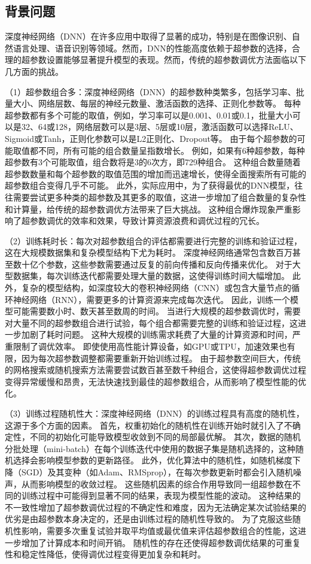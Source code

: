 \subsection{背景问题}

深度神经网络（DNN）在许多应用中取得了显著的成功，特别是在图像识别、自然语言处理、语音识别等领域。然而，DNN的性能高度依赖于超参数的选择，合理的超参数设置能够显著提升模型的表现。然而，传统的超参数调优方法面临以下几方面的挑战。

（1）超参数组合多：深度神经网络（DNN）的超参数种类繁多，包括学习率、批量大小、网络层数、每层的神经元数量、激活函数的选择、正则化参数等。
每种超参数都有多个可能的取值，例如，学习率可以是0.001、0.01或0.1，批量大小可以是32、64或128，网络层数可以是3层、5层或10层，激活函数可以选择ReLU、Sigmoid或Tanh，正则化参数可以是L2正则化、Dropout等。
由于每个超参数的可能取值都不同，所有可能的组合数量呈指数增长。
例如，如果有6种超参数，每种超参数有3个可能取值，组合数将是3的6次方，即729种组合。
这种组合数量随着超参数数量和每个超参数的取值范围的增加而迅速增长，使得全面搜索所有可能的超参数组合变得几乎不可能。
此外，实际应用中，为了获得最优的DNN模型，往往需要尝试更多种类的超参数及其更多的取值，这进一步增加了组合数量的复杂性和计算量，给传统的超参数调优方法带来了巨大挑战。
这种组合爆炸现象严重影响了超参数调优的效率和效果，导致计算资源浪费和调优过程的冗长。

（2）训练耗时长：每次对超参数组合的评估都需要进行完整的训练和验证过程，这在大规模数据集和复杂模型结构下尤为耗时。
深度神经网络通常包含数百万甚至数十亿个参数，这些参数需要通过反复的前向传播和反向传播来优化。
对于大型数据集，每次训练迭代都需要处理大量的数据，这使得训练时间大幅增加。
此外，复杂的模型结构，如深度较大的卷积神经网络（CNN）或包含大量节点的循环神经网络（RNN），需要更多的计算资源来完成每次迭代。
因此，训练一个模型可能需要数小时、数天甚至数周的时间。
当进行大规模的超参数调优时，需要对大量不同的超参数组合进行试验，每个组合都需要完整的训练和验证过程，这进一步加剧了耗时问题。
这种大规模的训练需求耗费了大量的计算资源和时间，严重限制了调优效率。
即使使用高性能计算设备，如GPU或TPU，加速效果也有限，因为每次超参数调整都需要重新开始训练过程。
由于超参数空间巨大，传统的网格搜索或随机搜索方法需要尝试数百甚至数千种组合，这使得超参数调优过程变得异常缓慢和昂贵，无法快速找到最佳的超参数组合，从而影响了模型性能的优化。

（3）训练过程随机性大：深度神经网络（DNN）的训练过程具有高度的随机性，这源于多个方面的因素。
首先，权重初始化的随机性在训练开始时就引入了不确定性，不同的初始化可能导致模型收敛到不同的局部最优解。
其次，数据的随机分批处理（mini-batch）在每个训练迭代中使用的数据子集是随机选择的，这种随机选择会影响模型参数的更新路径。
此外，优化算法中的随机性，如随机梯度下降（SGD）及其变种（如Adam、RMSprop），在每次参数更新时都会引入随机噪声，从而影响模型的收敛过程。
这些随机因素的综合作用导致同一组超参数在不同的训练过程中可能得到显著不同的结果，表现为模型性能的波动。
这种结果的不一致性增加了超参数调优过程的不确定性和难度，因为无法确定某次试验结果的优劣是由超参数本身决定的，还是由训练过程的随机性导致的。
为了克服这些随机性影响，需要多次重复试验并取平均值或最优值来评估超参数组合的性能，这进一步增加了计算成本和时间开销。
随机性的存在还使得超参数调优结果的可重复性和稳定性降低，使得调优过程变得更加复杂和耗时。

